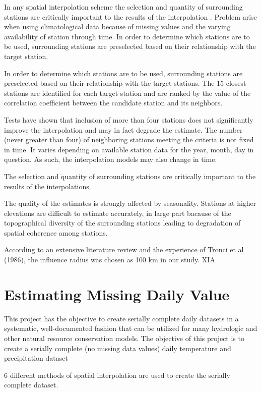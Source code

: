 \documentclass[WHATMANUAL.tex]{subfiles}
\begin{document}
In any spatial interpolation scheme the selection and quantity of surrounding stations are critically important to the results of the interpolation \citep{eischeid_quality_1995}. Problem arise when using climatological data because of missing values and the varying availability of station through time. In order to determine which stations are to be used, surrounding stations are preselected based on their relationship with the target station.

In order to determine which stations are to be used, surrounding stations are preselected based on their relationship with the target stations. The 15 closest stations are identified for each target station and are ranked by the value of the correlation coefficient between the candidate station  and its neighbors.

Tests have shown that inclusion of more than four stations does not significantly improve the interpolation and may in fact degrade the estimate. The number (never greater than four) of neighboring stations meeting the criteria is not fixed in time. It varies depending on available station data for the year, month, day in question. As such, the interpolation models may also change in time.

The selection and quantity of surrounding stations are critically important to the results of the interpolations.

The quality of the estimates is strongly affected by seasonality. Stations at higher elevations are difficult to estimate accurately, in large part bacause of the topographical diversity of the surrounding stations leading to degradation of spatial coherence among stations.

According to an extensive literature review and the experience of Tronci et al (1986), the influence radius was chosen as 100 km in our study. XIA

\section{Estimating Missing Daily Value}

This project \citep{eischeid_creating_2000} has the objective to create serially complete daily datasets in a systematic, well-documented fashion that can be utilized for many hydrologic and other natural resource conservation models. The objective of this project is to create a serially complete (no missing data values) daily temperature and precipitation dataset

6 different methods of spatial interpolation are used to create the serially complete dataset.
\end{document}
